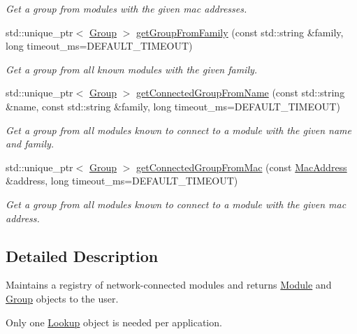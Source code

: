 \begin{DoxyCompactItemize}
\begin{DoxyCompactList}\small\item\em Get a group from modules with the given mac addresses. \end{DoxyCompactList}\item 
std\+::unique\+\_\+ptr$<$ \hyperlink{classhebi_1_1Group}{Group} $>$ \hyperlink{classhebi_1_1Lookup_a61243d9e23909ecc5511258452d4396f}{get\+Group\+From\+Family} (const std\+::string \&family, long timeout\+\_\+ms=D\+E\+F\+A\+U\+L\+T\+\_\+\+T\+I\+M\+E\+O\+UT)
\begin{DoxyCompactList}\small\item\em Get a group from all known modules with the given family. \end{DoxyCompactList}\item 
std\+::unique\+\_\+ptr$<$ \hyperlink{classhebi_1_1Group}{Group} $>$ \hyperlink{classhebi_1_1Lookup_afb22de42b4310292bd9a0a5848e3f3e6}{get\+Connected\+Group\+From\+Name} (const std\+::string \&name, const std\+::string \&family, long timeout\+\_\+ms=D\+E\+F\+A\+U\+L\+T\+\_\+\+T\+I\+M\+E\+O\+UT)
\begin{DoxyCompactList}\small\item\em Get a group from all modules known to connect to a module with the given name and family. \end{DoxyCompactList}\item 
std\+::unique\+\_\+ptr$<$ \hyperlink{classhebi_1_1Group}{Group} $>$ \hyperlink{classhebi_1_1Lookup_ad77bc157e336ee526157d5b31eb6bc22}{get\+Connected\+Group\+From\+Mac} (const \hyperlink{classhebi_1_1MacAddress}{Mac\+Address} \&address, long timeout\+\_\+ms=D\+E\+F\+A\+U\+L\+T\+\_\+\+T\+I\+M\+E\+O\+UT)
\begin{DoxyCompactList}\small\item\em Get a group from all modules known to connect to a module with the given mac address. \end{DoxyCompactList}\end{DoxyCompactItemize}


\subsection{Detailed Description}
Maintains a registry of network-\/connected modules and returns \hyperlink{classhebi_1_1Module}{Module} and \hyperlink{classhebi_1_1Group}{Group} objects to the user. 

Only one \hyperlink{classhebi_1_1Lookup}{Lookup} object is needed per application.

